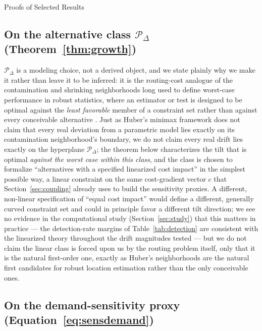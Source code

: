 \documentclass[trsc,dblanonrev]{informs4}
\begin{document}
\begin{APPENDIX}{Proofs of Selected Results}
\subsection{On the alternative class $\mathcal P_\Delta$ (Theorem~\ref{thm:growth})}

$\mathcal P_\Delta$ is a modeling choice, not a derived object, and we
state plainly why we make it rather than leave it to be inferred: it is
the routing-cost analogue of the contamination and shrinking
neighborhoods long used to define worst-case performance in robust
statistics, where an estimator or test is designed to be optimal
against the \emph{least favorable} member of a constraint set rather
than against every conceivable alternative
\citep{huber1964robust}. Just as Huber's minimax framework does not
claim that every real deviation from a parametric model lies exactly on
its contamination neighborhood's boundary, we do not claim every real
drift lies exactly on the hyperplane $\mathcal P_\Delta$; the theorem
below characterizes the tilt that is optimal \emph{against the worst
case within this class}, and the class is chosen to formalize
``alternatives with a specified linearized cost impact'' in the
simplest possible way, a linear constraint on the same cost-gradient
vector $c$ that Section~\ref{sec:coupling} already uses to build the
sensitivity proxies. A different, non-linear specification of ``equal
cost impact'' would define a different, generally curved constraint
set and could in principle favor a different tilt direction; we see no
evidence in the computational study
(Section~\ref{sec:study}) that this matters in practice --- the
detection-rate margins of Table~\ref{tab:detection} are consistent with
the linearized theory throughout the drift magnitudes tested --- but we
do not claim the linear class is forced upon us by the routing problem
itself, only that it is the natural first-order one, exactly as
Huber's neighborhoods are the natural first candidates for robust
location estimation rather than the only conceivable ones.

\subsection{On the demand-sensitivity proxy (Equation~\eqref{eq:sensdemand})}


\end{APPENDIX}
\end{document}
